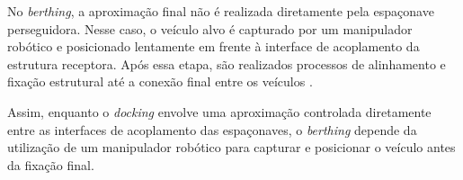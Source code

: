 No \textit{berthing}, a aproximação final não é realizada diretamente pela espaçonave perseguidora. Nesse caso, o veículo alvo é capturado por um manipulador robótico e posicionado lentamente em frente à interface de acoplamento da estrutura receptora. Após essa etapa, são realizados processos de alinhamento e fixação estrutural até a conexão final entre os veículos \cite{cook2011}.

Assim, enquanto o \textit{docking} envolve uma aproximação controlada diretamente entre as interfaces de acoplamento das espaçonaves, o \textit{berthing} depende da utilização de um manipulador robótico para capturar e posicionar o veículo antes da fixação final.